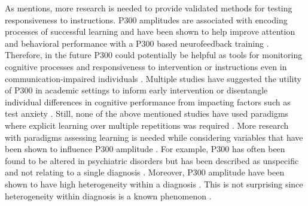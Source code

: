 As \textcite{vaughnRedefiningLearningDisabilities2003} mentions, more research is needed to provide validated methods for testing responsiveness to instructions. P300 amplitudes are associated with encoding processes of successful learning \parencite{polichUpdatingP300Integrative2007} and have been shown to help improve attention and behavioral performance with a P300 based neurofeedback training \parencite{arvanehP300BasedBrainComputerInterface2019}. Therefore, in the future P300 could potentially be helpful as tools for monitoring cognitive processes and responsiveness to intervention or instructions even in  communication-impaired individuals \parencite{connollyApplicationCognitiveEventrelated2000}. Multiple studies have suggested the utility of P300 in academic settings to inform early intervention or disentangle individual differences in cognitive performance from impacting factors such as test anxiety \parencite{priviteraUtilityP3Neuromarker2022, vonderembseTestAnxietyEffects2018,willnerRelevanceNeurophysiologicalMarker2015}. Still, none of the above mentioned studies have used paradigms where explicit learning over multiple repetitions was required \parencite[see.,][]{priviteraUtilityP3Neuromarker2022}. 
More research with paradigms assessing learning is needed while considering variables that have been shown to influence P300 amplitude  \parencite{cuiP300AmplitudeLatency2017,duncanEventrelatedPotentialsClinical2009,polichCognitiveBiologicalDeterminants1995,rigginsP300DevelopmentInfancy2020,surEventrelatedPotentialOverview2009,vandinterenP300DevelopmentLifespan2014}. For example,  P300 has often been found to be altered in psychiatric disorders \parencite{polichClinicalApplicationP3002004,surEventrelatedPotentialOverview2009} but has been described as unspecific and not relating to a single diagnosis \parencite{duncanEventrelatedPotentialsClinical2009}. Moreover, P300 amplitude have been shown to have high heterogeneity within a diagnosis \parencite[e.g.,][]{cuiP300AmplitudeLatency2017,kaiserEarlierLaterCognitive2020, martinussenMetaanalysisWorkingMemory2005}. This is not surprising since heterogeneity within diagnosis is a known phenomenon \parencite{astleAnnualResearchReview2022,kaiserEarlierLaterCognitive2020}.

